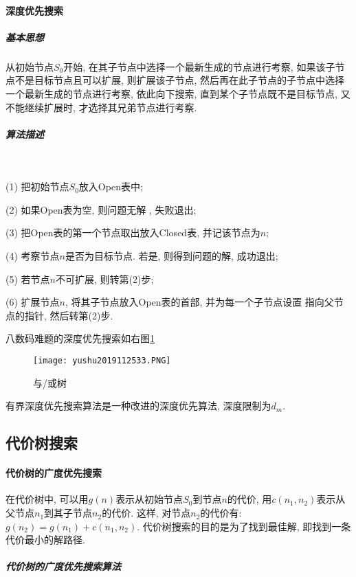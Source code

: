 \paragraph{深度优先搜索}
\subparagraph{基本思想}
从初始节点$S_0$开始, 在其子节点中选择一个最新生成的节点进行考察, 如果该子节点不是目标节点且可以扩展, 则扩展该子节点, 然后再在此子节点的子节点中选择一个最新生成的节点进行考察, 依此向下搜索, 直到某个子节点既不是目标节点, 又不能继续扩展时, 才选择其兄弟节点进行考察.
\subparagraph{算法描述}~{}

  (1) 把初始节点$S_0$放入Open表中;

  (2) 如果Open表为空, 则问题无解 , 失败退出;

  (3) 把Open表的第一个节点取出放入Closed表, 并记该节点为$n$;

  (4) 考察节点$n$是否为目标节点. 若是, 则得到问题的解, 成功退出;

  (5) 若节点$n$不可扩展, 则转第(2)步;

  (6) 扩展节点$n$, 将其子节点放入Open表的首部, 并为每一个子节点设置 指向父节点的指针, 然后转第(2)步.
\begin{example}
\end{example}

八数码难题的深度优先搜索如右图\ref{AI32fig33}
\begin{figure}[H]
\centering
\texttt{[image: yushu2019112533.PNG]}
\caption{与/或树 }
\label{AI32fig33}
\end{figure}
有界深度优先搜索算法是一种改进的深度优先算法, 深度限制为$d_m$.
\subsection{代价树搜索}
\paragraph{代价树的广度优先搜索}
    在代价树中, 可以用$g(n)$表示从初始节点$S_0$到节点$n$的代价, 用$c(n_1, n_2)$表示从父节点$n_1$到其子节点$n_2$的代价.
这样, 对节点$n_2$的代价有: $g(n_2)=g(n_1)+c(n_1, n_2)$. 代价树搜索的目的是为了找到最佳解, 即找到一条代价最小的解路径.
\subparagraph{代价树的广度优先搜索算法}


